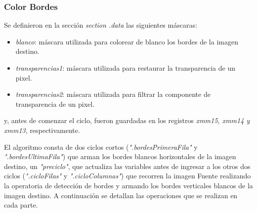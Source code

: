 \documentclass[a4paper]{article}
\begin{document}
\subsubsection{Color Bordes}
Se definieron en la sección \textit{section .data} las siguientes máscaras:

\begin{itemize}
	\item \textit{blanco}: máscara utilizada para colorear de blanco los bordes de la imagen destino.
	\item \textit{transparencias1}: máscara utilizada para restaurar la transparencia de un pixel.
	\item \textit{transparencias2}: máscara utilizada para filtrar la componente de transparencia de un pixel.	
\end{itemize}	
\justify
y, antes de comenzar el ciclo, fueron guardadas en los registros \textit{xmm15, xmm14 y xmm13}, respectivamente.


\justify
El algoritmo consta de dos ciclos cortos (\textit{".bordesPrimeraFila"} y \textit{".bordesUltimaFila"}) que arman los bordes blancos horizontales de la imagen destino, un \textit{"preciclo"}, que actualiza las variables antes de ingresar a los otros dos ciclos (\textit{".cicloFilas"} y \textit{".cicloColumnas"}) que recorren la imagen Fuente realizando la operatoria de detección de bordes y armando los bordes verticales blancos de la imagen destino. A continuación se detallan las operaciones que se realizan en cada parte.
\end{document}
